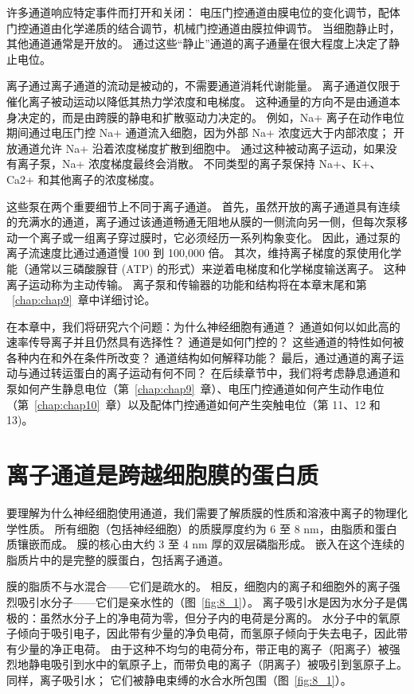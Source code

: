 许多通道响应特定事件而打开和关闭：
电压门控通道由膜电位的变化调节，配体门控通道由化学递质的结合调节，机械门控通道由膜拉伸调节。
当细胞静止时，其他通道通常是开放的。
通过这些“静止”通道的离子通量在很大程度上决定了静止电位。


离子通过离子通道的流动是被动的，不需要通道消耗代谢能量。
离子通道仅限于催化离子被动运动以降低其热力学浓度和电梯度。
这种通量的方向不是由通道本身决定的，而是由跨膜的静电和扩散驱动力决定的。
例如，Na+ 离子在动作电位期间通过电压门控 Na+ 通道流入细胞，因为外部 Na+ 浓度远大于内部浓度；
开放通道允许 Na+ 沿着浓度梯度扩散到细胞中。
通过这种被动离子运动，如果没有离子泵，Na+ 浓度梯度最终会消散。
不同类型的离子泵保持 Na+、K+、Ca2+ 和其他离子的浓度梯度。


这些泵在两个重要细节上不同于离子通道。
首先，虽然开放的离子通道具有连续的充满水的通道，离子通过该通道畅通无阻地从膜的一侧流向另一侧，但每次泵移动一个离子或一组离子穿过膜时，它必须经历一系列构象变化。
因此，通过泵的离子流速度比通过通道慢 100 到 100,000 倍。
其次，维持离子梯度的泵使用化学能（通常以三磷酸腺苷 (ATP) 的形式）来逆着电梯度和化学梯度输送离子。
这种离子运动称为主动传输。
离子泵和传输器的功能和结构将在本章末尾和第 ~\ref{chap:chap9}~章中详细讨论。


在本章中，我们将研究六个问题：为什么神经细胞有通道？
通道如何以如此高的速率传导离子并且仍然具有选择性？ 
通道是如何门控的？
这些通道的特性如何被各种内在和外在条件所改变？
通道结构如何解释功能？
最后，通过通道的离子运动与通过转运蛋白的离子运动有何不同？
在后续章节中，我们将考虑静息通道和泵如何产生静息电位（第~\ref{chap:chap9}~章）、电压门控通道如何产生动作电位（第~\ref{chap:chap10}~章）以及配体门控通道如何产生突触电位（第 11、12 和 13)。



\section{离子通道是跨越细胞膜的蛋白质}

要理解为什么神经细胞使用通道，我们需要了解质膜的性质和溶液中离子的物理化学性质。
所有细胞（包括神经细胞）的质膜厚度约为 6 至 8 nm，由脂质和蛋白质镶嵌而成。
膜的核心由大约 3 至 4 nm 厚的双层磷脂形成。
嵌入在这个连续的脂质片中的是完整的膜蛋白，包括离子通道。


膜的脂质不与水混合——它们是疏水的。
相反，细胞内的离子和细胞外的离子强烈吸引水分子——它们是亲水性的（图~\ref{fig:8_1}）。
离子吸引水是因为水分子是偶极的：虽然水分子上的净电荷为零，但分子内的电荷是分离的。
水分子中的氧原子倾向于吸引电子，因此带有少量的净负电荷，而氢原子倾向于失去电子，因此带有少量的净正电荷。
由于这种不均匀的电荷分布，带正电的离子（阳离子）被强烈地静电吸引到水中的氧原子上，而带负电的离子（阴离子）被吸引到氢原子上。
同样，离子吸引水； 它们被静电束缚的水合水所包围（图~\ref{fig:8_1}）。


